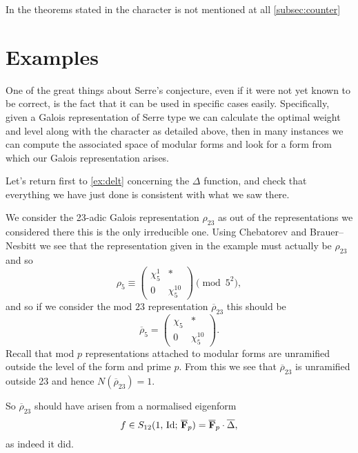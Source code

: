 \documentclass[a4paper,12pt]{article}
\begin{document}
In the theorems stated in \cite{KWI,KWII} the character is not mentioned at all \cref{subsec:counter}


\section{Examples}
One of the great things about Serre's conjecture, even if it were not yet known to be correct, is the fact that it can be used in specific cases easily.
Specifically, given a Galois representation of Serre type we can calculate the optimal weight and level along with the character as detailed above, then in many instances we can compute the associated space of modular forms and look for a form from which our Galois representation arises.

\begin{ex}
Let's return first to \cref{ex:delt} concerning the $\Delta$ function, and check that everything we have just done is consistent with what we saw there. %

We consider the 23-adic Galois representation $\rho_{23}$ as out of the representations we considered there this is the only irreducible one.
Using Chebatorev and Brauer--Nesbitt we see that the representation given in the example must actually be $\rho_{23}$ and so %
\[
\rho_5 \equiv \begin{pmatrix}
\chi_5^1 & * \\
0        & \chi_5^{10}
\end{pmatrix}\pmod{5^2},
\]
and so if we consider the mod $23$ representation $\overline{\rho}_{23}$ this should be
\[
\overline{\rho}_5 = \begin{pmatrix}
\chi_5 & * \\
0        & \chi_5^{10}
\end{pmatrix}. %
\]
Recall that mod $p$ representations attached to modular forms are unramified outside the level of the form and prime $p$.
From this we see that $\overline{\rho}_{23}$ is unramified outside 23 and hence $N(\overline{\rho}_{23}) = 1$.




So $\overline{\rho}_{23}$ should have arisen from a normalised eigenform
\[
f\in S_{12}(1,\,\mathrm{Id};\,\overline{\mathbf{F}}_p) = \overline{\mathbf{F}}_p\cdot \overline{\Delta},
\]
as indeed it did.
\end{ex}
\end{document}
